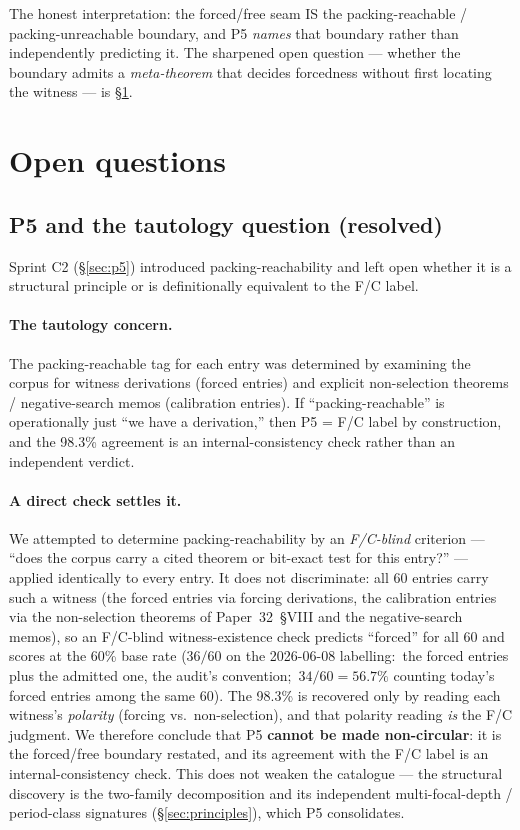 \documentclass[11pt,a4paper]{article}
\theoremstyle{plain}
\theoremstyle{definition}
\begin{document}
The honest interpretation:  the forced/free seam IS the packing-reachable / packing-unreachable boundary, and P5 \emph{names} that boundary rather than independently predicting it. The sharpened open question --- whether the boundary admits a \emph{meta-theorem} that decides forcedness without first locating the witness --- is \S\ref{sec:open}.

\section{Open questions}
\label{sec:open}

\subsection{P5 and the tautology question (resolved)}
\label{sec:open_family2}

Sprint C2 (\S\ref{sec:p5}) introduced packing-reachability and left open whether it is a structural principle or is definitionally equivalent to the F/C label.

\paragraph{The tautology concern.} The packing-reachable tag for each entry was determined by examining the corpus for witness derivations (forced entries) and explicit non-selection theorems / negative-search memos (calibration entries).  If ``packing-reachable'' is operationally just ``we have a derivation,'' then P5 = F/C label by construction, and the 98.3\% agreement is an internal-consistency check rather than an independent verdict.

\paragraph{A direct check settles it.} We attempted to determine packing-reachability by an \emph{F/C-blind} criterion --- ``does the corpus carry a cited theorem or bit-exact test for this entry?'' --- applied identically to every entry.  It does not discriminate:  all 60 entries carry such a witness (the forced entries via forcing derivations, the calibration entries via the non-selection theorems of Paper~32~\S VIII and the negative-search memos), so an F/C-blind witness-existence check predicts ``forced'' for all 60 and scores at the 60\% base rate ($36/60$ on the 2026-06-08 labelling:\ the forced entries plus the admitted one, the audit's convention;\ $34/60 = 56.7\%$ counting today's forced entries among the same 60).  The 98.3\% is recovered only by reading each witness's \emph{polarity} (forcing vs.\ non-selection), and that polarity reading \emph{is} the F/C judgment.  We therefore conclude that P5 \textbf{cannot be made non-circular}:  it is the forced/free boundary restated, and its agreement with the F/C label is an internal-consistency check.  This does not weaken the catalogue --- the structural discovery is the two-family decomposition and its independent multi-focal-depth / period-class signatures (\S\ref{sec:principles}), which P5 consolidates.
\end{document}
